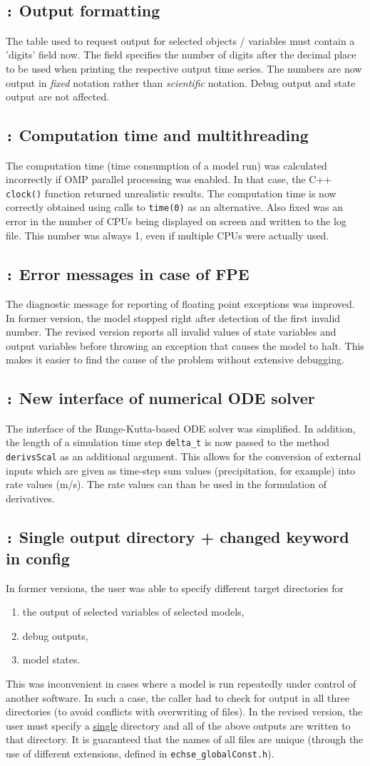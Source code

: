 \documentclass[a4paper,10pt]{article}
\newcommand{\logentry}[2]{\subsection*{\texttt{\color{red}{#1}:} \large{\textbf{#2}}}}
\begin{document}
\logentry{2014-02-21}{Output formatting}
The table used to request output for selected objects / variables must contain a 'digits' field now. The field specifies the number of digits after the decimal place to be used when printing the respective output time series. The numbers are now output in \emph{fixed} notation rather than \emph{scientific} notation. Debug output and state output are not affected.

\logentry{2013-03-18}{Computation time and multithreading}
The computation time (time consumption of a model run) was calculated incorrectly if OMP parallel processing was enabled. In that case, the C++ \verb!clock()! function returned unrealistic results. The computation time is now correctly obtained using calls to \verb!time(0)! as an alternative.
Also fixed was an error in the number of CPUs being displayed on screen and written to the log file. This number was always 1, even if multiple CPUs were actually used.

\logentry{2012-07-05}{Error messages in case of FPE}
The diagnostic message for reporting of floating point exceptions was improved. In former version, the model stopped right after detection of the first invalid number. The revised version reports all invalid values of state variables and output variables before throwing an exception that causes the model to halt. This makes it easier to find the cause of the problem without extensive debugging.

\logentry{2012-06-19}{New interface of numerical ODE solver}
The interface of the Runge-Kutta-based ODE solver was simplified. In addition, the length of a simulation time step \verb!delta_t! is now passed to the method \verb!derivsScal! as an additional argument. This allows for the conversion of external inputs which are given as time-step sum values (precipitation, for example) into rate values (m/s). The rate values can than be used in the formulation of derivatives.

\logentry{2012-05-14}{Single output directory + changed keyword in config}
In former versions, the user was able to specify different target directories for
\begin{enumerate}
  \item the output of selected variables of selected models,
  \item debug outputs,
  \item model states.
\end{enumerate}

This was inconvenient in cases where a model is run repeatedly under control of another software. In such a case, the caller had to check for output in all three directories (to avoid conflicts with overwriting of files). In the revised version, the user must specify a \underline{single} directory and all of the above outputs are written to that directory. It is guaranteed that the names of all files are unique (through the use of different extensions, defined in \verb!echse_globalConst.h!).
\end{document}
